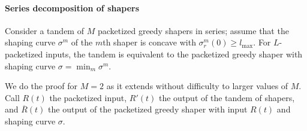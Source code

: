 %
%

\paragraph{Series decomposition of shapers}
\begin{theorem}
Consider a tandem of $M$ packetized greedy shapers in series;
assume that the shaping curve $\sigma^m$ of the $m$th shaper is
concave with $\sigma^m_r(0) \geq l_{\max}$. For $L$-packetized
inputs, the tandem is equivalent to the packetized greedy shaper
with shaping curve $\sigma= \min_m \sigma^m$.
\end{theorem}
\pr We do the proof for $M=2$ as it extends without difficulty to
larger values of $M$. Call $R(t)$ the packetized input, $R'(t)$
the output of the tandem of shapers, and $\overline{R}(t)$ the
output of the packetized greedy shaper with input $R(t)$ and shaping curve $\sigma$.

